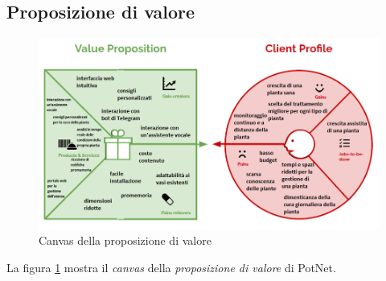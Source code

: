 \subsection{Proposizione di valore}

\begin{figure}[h]
	\centering
	\includegraphics[width=\textwidth]{images/value_proposition.png}
	\caption{Canvas della proposizione di valore}
	\label{fig:value_proposition}
\end{figure}

La figura \ref{fig:value_proposition} mostra il \textit{canvas} della \textit{proposizione di valore} di PotNet.